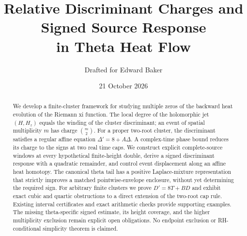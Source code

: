 \documentclass[11pt]{article}
\title{Relative Discriminant Charges and Signed Source Response\\in Theta Heat Flow}
\author{Drafted for Edward Baker}
\date{21 October 2026}
\theoremstyle{definition}
\theoremstyle{remark}
\numberwithin{equation}{section}
\begin{document}
\maketitle
\begin{abstract}
We develop a finite-cluster framework for studying multiple zeros of the
backward heat evolution of the Riemann xi function. The local degree of
the holomorphic jet $(H,H_z)$ equals the winding of the cluster
discriminant; an event of spatial multiplicity $m$ has charge
$\binom m2$. For a proper two-root cluster, the discriminant satisfies a
regular affine equation $\Delta'=8+A\Delta$. A complex-time phase bound
reduces its charge to the signs at two real time caps. We construct
explicit complete-source windows at every hypothetical finite-height
double, derive a signed discriminant response with a quadratic remainder,
and control event displacement along an affine heat homotopy. The
canonical theta tail has a positive Laplace-mixture representation that
strictly improves a matched pointwise-envelope enclosure, without yet
determining the required sign. For arbitrary finite clusters we prove
$D'=8T+BD$ and exhibit exact cubic and quartic obstructions to a direct
extension of the two-root cap rule. Existing interval certificates and
exact arithmetic checks provide supporting examples. The missing
theta-specific signed estimate, its height coverage, and the higher
multiplicity exclusion remain explicit open obligations. No endpoint
exclusion or RH-conditional simplicity theorem is claimed.
\end{abstract}
\clearpage
\begingroup
\small
\tableofcontents
\endgroup
\clearpage







\end{document}
